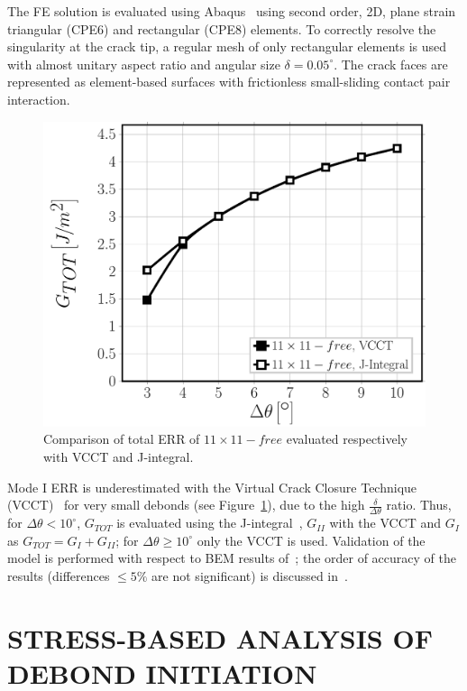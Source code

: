 \documentclass[12pt,a4paper]{article}
\begin{document}
The FE solution is evaluated using Abaqus~\cite{abq12} using second order, 2D, plane strain triangular (CPE6) and rectangular (CPE8) elements. To correctly resolve the singularity at the crack tip, a regular mesh of only rectangular elements is used with almost unitary aspect ratio and angular size $\delta=0.05^{\circ}$. The crack faces are represented as element-based surfaces with frictionless small-sliding contact pair interaction.

\begin{figure}[!h]
\centering
        \includegraphics[height=0.3\textheight]{vf60-G-methodsaccuracy.pdf}
\caption{Comparison of total ERR of $11\times11-free$ evaluated respectively with VCCT and J-integral.}\label{fig:errerror}
\end{figure}

Mode I ERR is underestimated with the Virtual Crack Closure Technique (VCCT)~\cite{Krueger2004} for very small debonds (see Figure~\ref{fig:errerror}), due to the high $\frac{\delta}{\Delta\theta}$ ratio. Thus, for $\Delta\theta<10^{\circ}$, $G_{TOT}$ is evaluated using the J-integral~\cite{Rice1968}, $G_{II}$ with the VCCT and $G_{I}$ as $G_{TOT}=G_{I}+G_{II}$; for $\Delta\theta\geq10^{\circ}$ only the VCCT is used. Validation of the model is performed with respect to BEM results of~\cite{Paris2007,Sandino2016}; the order of accuracy of the results (differences $\leq5\%$ are not significant) is discussed in~\cite{DiStasio2019}.

\section{STRESS-BASED ANALYSIS OF DEBOND INITIATION}
\end{document}
